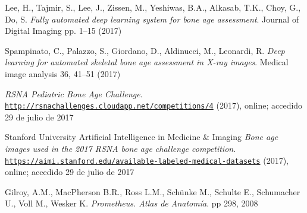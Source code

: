 \documentclass[conference]{IEEEtran}
\begin{document}
\begin{thebibliography}{00}
Lee, H., Tajmir, S., Lee, J., Zissen, M., Yeshiwas, B.A., Alkasab, T.K., Choy, G., Do, S.
\textit{Fully automated deep learning system for bone age assessment}.
Journal of Digital Imaging pp. 1–15 (2017)

Spampinato, C., Palazzo, S., Giordano, D., Aldinucci, M., Leonardi, R.
\textit{Deep learning for automated skeletal bone age assessment in X-ray images}.
Medical image analysis 36, 41–51 (2017)

\textit{RSNA Pediatric Bone Age Challenge}.
\\\texttt{\url{http://rsnachallenges.cloudapp.net/competitions/4}} (2017), online; accedido 29 de julio de 2017

Stanford University Artificial Intelligence in Medicine \& Imaging
\textit{Bone age images used in the 2017 RSNA bone age challenge competition}.
\\\texttt{\url{https://aimi.stanford.edu/available-labeled-medical-datasets}} 
(2017), online; accedido 29 de julio de 2017


Gilroy, A.M., MacPherson B.R., Ross L.M., Schünke M., Schulte E., Schumacher U., Voll M., Wesker K.
\textit{Prometheus. Atlas de Anatomía}.
pp 298, 2008
\end{thebibliography}
\end{document}
